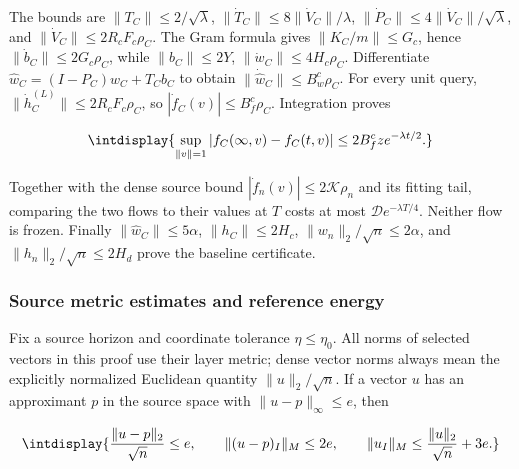 
The bounds are \(\|T_C\|\le2/\sqrt\lambda\), \(\|\dot T_C\|\le8\|\dot V_C\|/\lambda\), \(\|\dot P_C\|\le4\|\dot V_C\|/\sqrt\lambda\), and \(\|\dot V_C\|\le2R_cF_c\rho_C\). The Gram formula gives \(\|K_C/m\|\le G_c\), hence \(\|\dot b_C\|\le2G_c\rho_C\), while \(\|b_C\|\le2Y\), \(\|\dot w_C\|\le4H_c\rho_C\). Differentiate \(\widehat w_C=(I-P_C)w_C+T_Cb_C\) to obtain \(\|\dot{\widehat w}_C\|\le B_w^c\rho_C\). For every unit query, \(\|\dot h_C^{(L)}\|\le2R_cF_c\rho_C\), so \(|\dot f_C(v)|\le B_f^c\rho_C\). Integration proves


\begingroup\renewcommand{\theHequation}{intdisplay.576}
\begin{equation}
\intdisplay{
\sup_{\|v\|=1}|f_C(\infty,v)-f_C(t,v)|
        \le2B_f^cz e^{-\lambda t/2}.
}
\label{int:eq-0240-harmonic-endpoint-tail}
\end{equation}
\endgroup


Together with the dense source bound \(|\dot f_n(v)|\le2\mathcal K\rho_n\) and its fitting tail, comparing the two flows to their values at \(T\) costs at most \(\mathcal D e^{-\lambda T/4}\). Neither flow is frozen. Finally \(\|\widehat w_C\|\le5\alpha\), \(\|h_C\|\le2H_c\), \(\|w_n\|_2/\sqrt n\le2\alpha\), and \(\|h_n\|_2/\sqrt n\le2H_d\) prove the baseline certificate.


\subsubsection{Source metric estimates and reference energy}
\label{int:compact-source-energy-proof}
\label{int:harmonic-source-energy-proof}


Fix a source horizon and coordinate tolerance \(\eta\le\eta_0\). All norms of selected vectors in this proof use their layer metric; dense vector norms always mean the explicitly normalized Euclidean quantity \(\|u\|_2/\sqrt n\). If a vector \(u\) has an approximant \(p\) in the source space with \(\|u-p\|_\infty\le e\), then


\begingroup\renewcommand{\theHequation}{intdisplay.577}
\begin{equation}
\intdisplay{
\frac{\|u-p\|_2}{\sqrt n}\le e,\qquad
\|(u-p)_I\|_M\le2e,\qquad
\|u_I\|_M\le\frac{\|u\|_2}{\sqrt n}+3e.
}
\label{int:eq-0241-harmonic-source-norm-transfer}
\end{equation}
\endgroup

